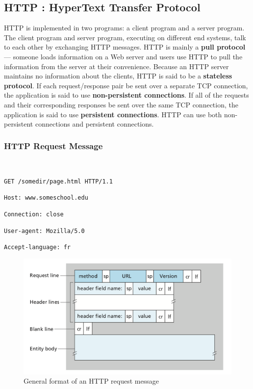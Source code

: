 \documentclass[11pt]{article}
\begin{document}
\subsection{HTTP : HyperText Transfer Protocol}

HTTP is implemented in two programs: a client program and a server program. The client program and server program, executing on different end systems, talk to each other by exchanging HTTP messages.
HTTP is mainly a \textbf{pull protocol} --- someone loads information on a Web server and users use HTTP to pull the information from the server at their convenience.
Because an HTTP server maintains no information about the clients, HTTP is said to be a \textbf{stateless protocol}.
If each request/response pair be sent over a separate TCP connection, the application is said to use \textbf{non-persistent connections}. If all of the requests and their corresponding responses be sent over the same TCP connection, the application is said to use \textbf{persistent connections}. HTTP can use both non-persistent connections and persistent connections.

\subsubsection{HTTP Request Message}

~\ 

\texttt{GET /somedir/page.html HTTP/1.1}

\texttt{Host: www.someschool.edu}

\texttt{Connection: close}

\texttt{User-agent: Mozilla/5.0}

\texttt{Accept-language: fr}

\begin{figure}[h]
	\centering
	\includegraphics[width=0.8\linewidth]{images/HttpRequest.png}
	\caption{General format of an HTTP request message}
	\label{fig:HttpRequest}
\end{figure}
\end{document}
